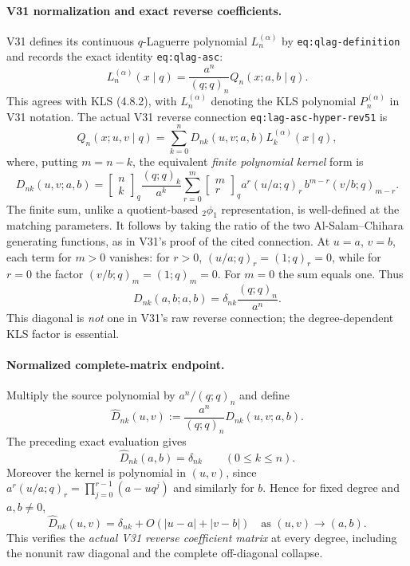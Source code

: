 \documentclass[11pt]{article}
\begin{document}
\paragraph{V31 normalization and exact reverse coefficients.}
V31 defines its continuous $q$-Laguerre polynomial $L_n^{(\alpha)}$ by
\texttt{eq:qlag-definition} and records the exact identity
\texttt{eq:qlag-asc}:
\[
 L_n^{(\alpha)}(x\mid q)=\frac{a^n}{(q;q)_n}Q_n(x;a,b\mid q).
\]
This agrees with KLS (4.8.2), with $L_n^{(\alpha)}$ denoting the KLS polynomial $P_n^{(\alpha)}$ in V31 notation.
The actual V31 reverse connection \texttt{eq:lag-asc-hyper-rev51} is
\[
 Q_n(x;u,v\mid q)=\sum_{k=0}^n D_{nk}(u,v;a,b) L_k^{(\alpha)}(x\mid q),
\]
where, putting $m=n-k$, the equivalent \emph{finite polynomial kernel} form is
\[
 D_{nk}(u,v;a,b)=\begin{bmatrix}n\\k\end{bmatrix}_q
 \frac{(q;q)_k}{a^k}
 \sum_{r=0}^{m}\begin{bmatrix}m\\r\end{bmatrix}_q
 a^r(u/a;q)_r\,b^{m-r}(v/b;q)_{m-r}.
\]
The finite sum, unlike a quotient-based ${}_2\phi_1$ representation, is well-defined at the matching parameters. It follows by taking the ratio of the two Al-Salam--Chihara generating functions, as in V31's proof of the cited connection.
At $u=a$, $v=b$, each term for $m>0$ vanishes: for $r>0$, $(u/a;q)_r=(1;q)_r=0$, while for $r=0$ the factor $(v/b;q)_m=(1;q)_m=0$. For $m=0$ the sum equals one. Thus
\[
 \boxed{D_{nk}(a,b;a,b)=\delta_{nk}\frac{(q;q)_n}{a^n}.}
\]
This diagonal is \emph{not} one in V31's raw reverse connection; the degree-dependent KLS factor is essential.

\paragraph{Normalized complete-matrix endpoint.}
Multiply the source polynomial by $a^n/(q;q)_n$ and define
\[
 \widehat D_{nk}(u,v):=\frac{a^n}{(q;q)_n}D_{nk}(u,v;a,b).
\]
The preceding exact evaluation gives
\[
 \boxed{\widehat D_{nk}(a,b)=\delta_{nk}\qquad(0\le k\le n).}
\]
Moreover the kernel is polynomial in $(u,v)$, since
$a^r(u/a;q)_r=\prod_{j=0}^{r-1}(a-uq^j)$ and similarly for $b$.
Hence for fixed degree and $a,b\ne0$,
\[
 \widehat D_{nk}(u,v)=\delta_{nk}+O(|u-a|+|v-b|)
 \quad\text{as }(u,v)\to(a,b).
\]
This verifies the \emph{actual V31 reverse coefficient matrix} at every degree, including the nonunit raw diagonal and the complete off-diagonal collapse.
\end{document}
